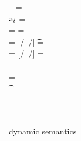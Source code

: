 \documentclass[acmlarge, anonymous, authordraft]{acmart}
\begin{document}
%
\begin{figure}[!h]
\noindent\hrulefill


\medskip
\small

\begin{minipage}{\textwidth}
\small        
\begin{tabbing}
\K\HS \New\C{\b\a} \HS\HS\HS\= \s~ \HS\HS \=\Red\HS\HS \= \K \HS\= \ap \HS\HS\= \sp\HS\HS \= \WHERE\HS\= \fresh\ap \HS\HS\HS\HS\HS\HS\HS\HS\=  \sp = {\Map{}}
\\
\K\HS \FReadR{} \> \s           \>\Red\>     \K \>${\sf{a}}_i$ \> \s  \> \WHERE \>\App\s\a=\obj{}
\\
\K{} \> \s     \>\Red\>     \K \> \ap \> \sp \>  \WHERE \>\App\s\a=\obj{} \HS  \> \sp = \Map{}
\\
\K\HS{\KCall\a\m\ap\t\tp} \> \s    \>\Red\>     \K \>  \ep \> \s \> \WHERE\> \ep = {[\a/\this~{\ap/\x}]\e} \HS \> \Mdef\m\x\t\tp\e\In \App\K\C  \HS  \App\s\a=\obj{}
\\
 \K\HS {\DynCall\a\m\ap}\> \s        \>\Red\>    \K \> \ep \> \s \>  \WHERE\> \ep = {[\a/\this~{\ap/\x}]\e}\HS \> \Mdef\m\x\any\any\e \In \App\K\C \HS \App\s\a=\obj{}
\\
 \K\HS {\SubCast \any\a} \> \s       \>\Red\>   \K \> \a \> \s
\\
 \K\HS {\SubCast \D\a} \> \s        \>\Red\>    \K \> \a \> \s \>  \WHERE\> \StrSub {}\K\C \D \>\App\s\a=\obj{} 
\\
 \K\HS {\BehCast \t\a} \> \s         \>\Red\>   \Kp \> \ap \> \sp \> \WHERE\> \behcast \a\t\s\K \Kp\ap\sp    
\\
\K\HS\e \>\s                         \>\Red\>   \Kp \> \ep \> \sp
\\
 \K \HS \EM{\EE[\e]} \> \s               \>\Red\>   \Kp \> \EM{\EE[\ep]} \> \sp \> \WHERE \> \K~\e~\s \Red~\Kp~\ep~\sp
\end{tabbing}
\end{minipage}

\medskip

\hrulefill
\caption{\kafka dynamic semantics}\label{fig:semantics}
\end{figure}
\end{document}
